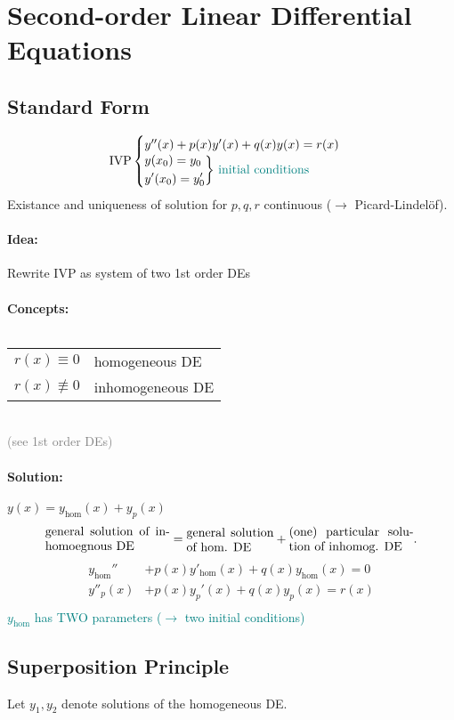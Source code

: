 \documentclass[]{article}
\begin{document}
\section{Second-order Linear Differential Equations}
\subsection{Standard Form}
\[
\text{IVP}
\begin{cases} 
	y''(x)+p(x)y'(x)+q(x)y(x)  = r(x) & \\
	  \begin{aligned} 
	 	&y(x_0) =y_0 \\
	 	&y'(x_0) =y_0'
\end{aligned}
\bigg\} \text{ \textcolor{teal}{initial conditions}} 
					  & 
\end{cases}
\]
Existance and uniqueness of solution for $p,q,r$ continuous ($\to$ Picard-Lindelöf).
\paragraph{Idea:} Rewrite IVP as system of two 1st order DEs
\paragraph{Concepts:}$~$\\ 
\begin{tabular}{@{}l l}
	$r(x)\equiv0$ &homogeneous DE\\
	$r(x)\not\equiv0$ &inhomogeneous DE
\end{tabular}\\
\textcolor{gray}{(see 1st order DEs)}
\paragraph{Solution:} $y(x)=y_\text{hom}(x)+y_p(x)$
\[
	\parbox{10em}{general solution of inhomoegnous DE} =
	\parbox{7em}{general solution of hom. DE} +
	\parbox{10em}{(one) particular solution of inhomog. DE}
.\]
\[
\begin{split}
	y_\text{hom}'' &+p(x)y'_ \text{hom}(x)+q(x)y_ \text{hom}(x) =0\\
	y''_p(x) &+p(x)y_p'(x)+q(x)y_p(x) =r(x)\\
\end{split}
\]
\textcolor{teal}{$y_\text{hom}$ has TWO parameters ($\to$ two initial conditions)}
\subsection{Superposition Principle}
Let $y_1,y_2$ denote solutions of the homogeneous DE.
\end{document}
